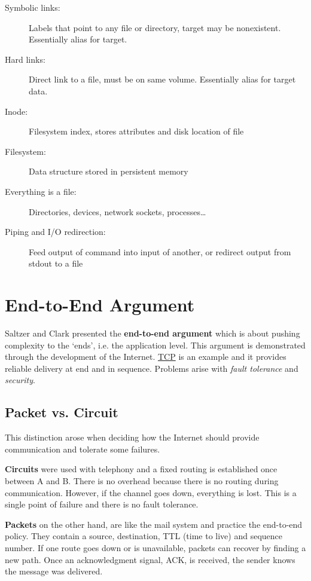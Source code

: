 \documentclass[twoside]{article}
\begin{document}
\begin{description}
\item[Symbolic links:] Labels that point to any file or directory, target may be
  nonexistent. Essentially alias for target.
\item[Hard links:] Direct link to a file, must be on same volume. Essentially
  alias for target data.
\item[Inode:] Filesystem index, stores attributes and disk location of file
\item[Filesystem:] Data structure stored in persistent memory
\item[Everything is a file:] Directories, devices, network sockets,
  processes\ldots
\item[Piping and I/O redirection:] Feed output of command into input of another,
  or redirect output from stdout to a file
\end{description}

\section{End-to-End Argument}
Saltzer and Clark presented the \textbf{end-to-end argument} which is about
pushing complexity to the `ends', i.e. the application level. This argument is
demonstrated through the development of the Internet. \underline{TCP} is an
example and it provides reliable delivery at end and in sequence. Problems arise
with \emph{fault tolerance} and \emph{security}.

\subsection{Packet vs. Circuit}
This distinction arose when deciding how the Internet should provide
communication and tolerate some failures.

\textbf{Circuits} were used with telephony and a fixed routing is established
once between A and B. There is no overhead because there is no routing during
communication. However, if the channel goes down, everything is lost. This is a
single point of failure and there is no fault tolerance.

\textbf{Packets} on the other hand, are like the mail system and practice the
end-to-end policy. They contain a source, destination, TTL (time to live) and
sequence number. If one route goes down or is unavailable, packets can recover
by finding a new path. Once an acknowledgment signal, ACK, is received, the
sender knows the message was delivered.
\end{document}
